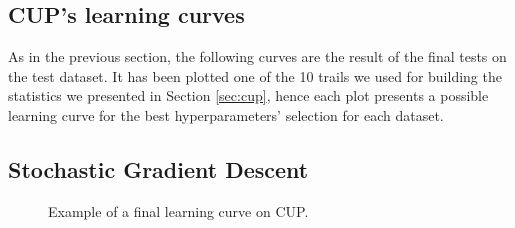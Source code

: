 \begin{appendices}



    \chapter{CUP's learning curves} %
    \label{cha:cup_learning_curves}
        As in the previous section, the following curves are the result of the final tests on the test dataset. It has been plotted one of the 10 trails we used for building the statistics we presented in Section \ref{sec:cup}, hence each plot presents a possible learning curve for the best hyperparameters’ selection for each dataset.
        \section{Stochastic Gradient Descent} %
        \label{sec:cup_sgd}

            \begin{figure}[H]
                \centering
                    \label{fig:cup_MSE_SGD}
                \caption{Example of a final learning curve on CUP.}
                \label{fig:cup_SGD}
            \end{figure}


\end{appendices}
